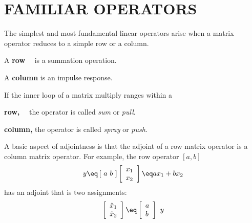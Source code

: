 \section{FAMILIAR OPERATORS}
The simplest and most fundamental linear operators
arise when a matrix operator reduces to a simple row or a column.
\par\noindent
A {\bf row} \quad\ \ is a summation operation.
\par\noindent
A {\bf column}       is an impulse response.
\vspace{.2in}
\par\noindent
If the inner loop of a matrix multiply ranges within a
\par\noindent
{\bf row,} \quad\ \ the operator is called {\em  sum} or {\em  pull}.
\par\noindent
{\bf column,}       the operator is called {\em  spray} or {\em  push}.

\par
A basic aspect of adjointness is that the
adjoint of a row matrix operator is a column matrix operator.
For example,
the row operator $[a,b]$
\begin{equation}
y \eq
\left[ \ a \ b \ \right] 
\left[
\begin{array}{l}
        x_1 \\
        x_2
\end{array}
\right] 
\eq
a x_1 + b x_2
\end{equation}
has an adjoint that is two assignments:
\begin{equation}
        \left[
        \begin{array}{l}
                \hat x_1 \\
                \hat x_2
        \end{array}
        \right]
        \eq
        \left[
        \begin{array}{l}
                a \\
                b
        \end{array}
        \right]
        \ y
\end{equation}
\par
{}

